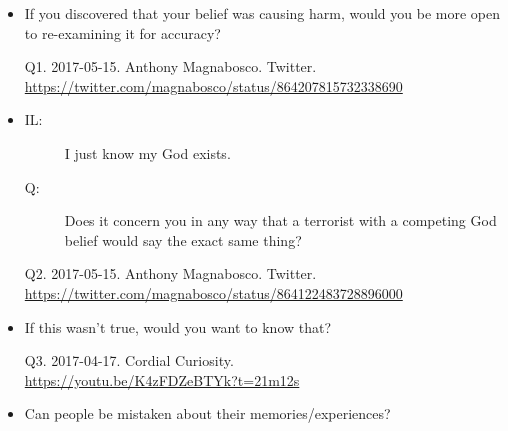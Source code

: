 \documentclass[a4paper]{scrartcl}
\begin{document}
        \begin{itemize}
                    \item If you discovered that your belief was causing harm, would you be more open to re-examining it for accuracy?
                    
                \begin{tiny}
                    Q1.
                    2017-05-15.
                    Anthony Magnabosco.
                        Twitter.
                        \\
                        \url{ https://twitter.com/magnabosco/status/864207815732338690 }
                    \par
                \end{tiny}
                    \item
                    \begin{description}
                        \item[IL:] I just know my God exists.
                        \item[Q:] Does it concern you in any way that a terrorist with a competing God belief would say the exact same thing?
                    \end{description}
                    
                \begin{tiny}
                    Q2.
                    2017-05-15.
                    Anthony Magnabosco.
                        Twitter.
                        \\
                        \url{ https://twitter.com/magnabosco/status/864122483728896000 }
                    \par
                \end{tiny}
                    \item If this wasn't true, would you want to know that?
                    
                \begin{tiny}
                    Q3.
                    2017-04-17.
                    Cordial Curiosity.
                        \\
                        \url{ https://youtu.be/K4zFDZeBTYk?t=21m12s }
                    \par
                \end{tiny}
                    \item Can people be mistaken about their memories\slash experiences?
                    

\end{itemize}
\end{document}
